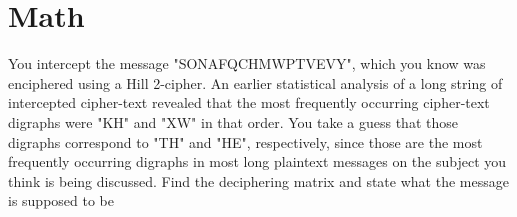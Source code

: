 \documentclass{../mathhomework}
\begin{document}
\maketitle

\pagebreak

\section{Math}

\begin{problem}
    You intercept the message "SONAFQCHMWPTVEVY", which you know was enciphered using a Hill 2-cipher. An earlier statistical analysis of a long string of intercepted cipher-text revealed that the most frequently occurring cipher-text digraphs were "KH" and "XW" in that order. You take a guess that those digraphs correspond to "TH" and "HE", respectively, since those are the most frequently occurring digraphs in most long plaintext messages on the subject you think is being discussed. Find the deciphering matrix and state what the message is supposed to be


\end{problem}
\end{document}
